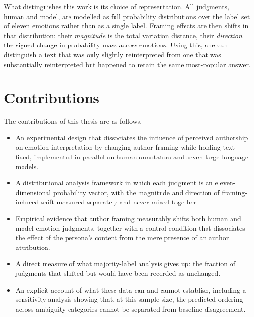 What distinguishes this work is its choice of representation. All judgments, human and model, are
modelled as full probability distributions over the label set of eleven emotions rather than as a
single label. Framing effects are then shifts in that distribution: their \emph{magnitude} is the total variation
distance, their \emph{direction} the signed change in probability mass across emotions. Using this,
one can distinguish a text that was only slightly reinterpreted from one that was substantially
reinterpreted but happened to retain the same most-popular answer.

\section{Contributions}
\label{intro:contributions}

\noindent
The contributions of this thesis are as follows.

\begin{itemize}
    \item An experimental design that dissociates the influence of perceived authorship on
    emotion interpretation by changing author framing while holding text fixed, implemented in
    parallel on human annotators and seven large language models.

    \item A distributional analysis framework in which each judgment is an eleven-dimensional
    probability vector, with the magnitude and direction of framing-induced shift measured
    separately and never mixed together.

    \item Empirical evidence that author framing measurably shifts both human and model emotion
    judgments, together with a control condition that dissociates the effect of the persona's
    content from the mere presence of an author attribution.

    \item A direct measure of what majority-label analysis gives up: the fraction of judgments
    that shifted but would have been recorded as unchanged.

    \item An explicit account of what these data can and cannot establish, including a
    sensitivity analysis showing that, at this sample size, the predicted ordering across
    ambiguity categories cannot be separated from baseline disagreement.
\end{itemize}

